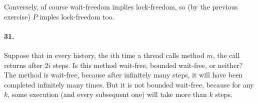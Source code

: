 \documentclass[
]{article}
\begin{document}
Conversely, of course wait-freedom implies lock-freedom, so (by the previous exercise) $P$ imples lock-freedom too.

\paragraph{31.} Suppose that in every history, the $i$th time a thread calls method $m$, the call returns after $2i$ steps. Is this method wait-free, bounded wait-free, or neither?  The method is wait-free, because after infinitely many steps, it will have been completed infinitely many times.  But it is not bounded wait-free, because for any $k$, some execution (and every subsequent one) will take more than $k$ steps.
\end{document}

